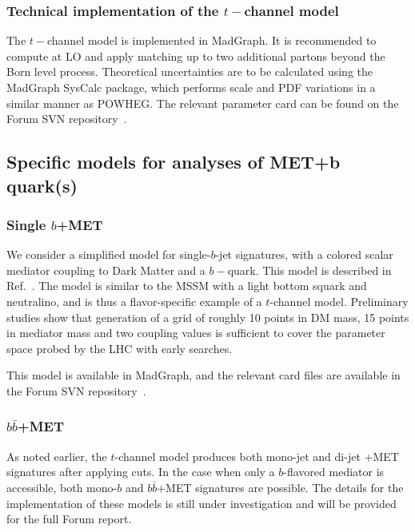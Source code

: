\documentclass[a4,debug,notitlepage,nobib]{tufte-handout}
\begin{document}
\subsubsection{Technical implementation of the $t-$channel model} 

The $t-$channel model is implemented in MadGraph. 
It is recommended
to compute at LO and apply matching up to two additional partons
beyond the Born level
process. Theoretical uncertainties are to be calculated using
the MadGraph SysCalc package, which performs scale and PDF variations
in a similar manner as POWHEG.
The relevant parameter card can be found on the Forum
SVN repository~\cite{ForumSVN_TChannel}. 

\subsection{Specific models for analyses of MET+b quark(s)}

\subsubsection{Single $b$+MET}

We consider a simplified model for single-$b$-jet signatures, 
with a colored scalar mediator coupling to Dark Matter and a $b-$quark. 
This model is described in Ref.~\cite{Agrawal:2014una}. 
The model is similar to the MSSM
with a light bottom squark and neutralino, and is thus a flavor-specific
example of a $t$-channel model. 
Preliminary studies 
show that generation of a grid of roughly 10 points in DM mass, 15 points in mediator
mass and two coupling values is sufficient to cover the parameter
space probed by the LHC with early searches. 

This model is available in MadGraph, and the relevant card files are 
available in the Forum SVN repository~\cite{ForumSVN_DMSingleB}.

\subsubsection{$b \bar{b}$+MET}

As noted earlier, the $t$-channel model produces both mono-jet and
di-jet +MET signatures after applying cuts.  In the case when
only a $b$-flavored mediator is accessible, both mono-$b$ and
$b\bar b$+MET signatures are possible. 
The details for the implementation of these
models is still under investigation and will be provided for the full Forum report.
\end{document}
